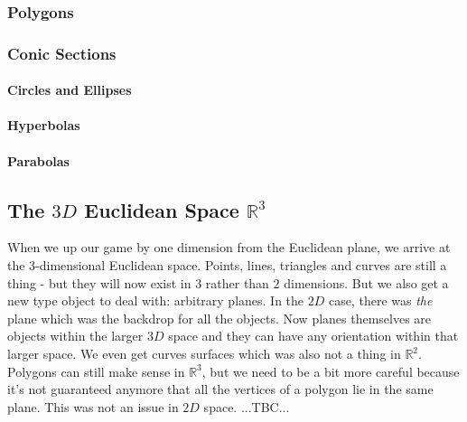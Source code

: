 \subsubsection{Polygons}


\subsubsection{Conic Sections}

\paragraph{Circles and Ellipses}

\paragraph{Hyperbolas}

\paragraph{Parabolas}






\subsection{The $3D$ Euclidean Space $\mathbb{R}^3$}
When we up our game by one dimension from the Euclidean plane, we arrive at the $3$-dimensional Euclidean space. Points, lines, triangles and curves are still a thing - but they will now exist in $3$ rather than $2$ dimensions. But we also get a new type object to deal with: arbitrary planes. In the $2D$ case, there was \emph{the} plane which was the backdrop for all the objects. Now planes themselves are objects within the larger $3D$ space and they can have any orientation within that larger space. We even get curves surfaces which was also not a thing in $\mathbb{R}^2$. Polygons can still make sense in $\mathbb{R}^3$, but we need to be a bit more careful because it's not guaranteed anymore that all the vertices of a polygon lie in the same plane. This was not an issue in $2D$ space. ...TBC...

